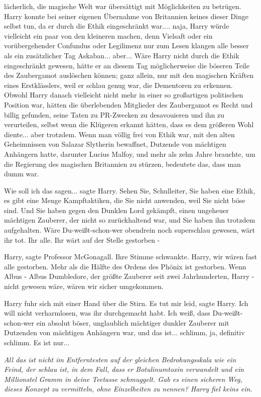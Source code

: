 lächerlich, die magische Welt war übersättigt mit Möglichkeiten zu betrügen.
Harry konnte bei seiner eigenen Übernahme von Britannien keines dieser Dinge
selbst tun, da er durch die Ethik eingeschränkt war.... naja, Harry würde
vielleicht ein paar von den kleineren machen, denn Vielsaft oder ein
vorübergehender Confundus oder Legilimenz nur zum Lesen klangen alle besser als
ein zusätzlicher Tag Askaban... aber... Wäre Harry nicht durch die Ethik
eingeschränkt gewesen, hätte er an diesem Tag möglicherweise die böseren Teile
des Zaubergamot auslöschen können; ganz allein, nur mit den magischen Kräften
eines Erstklässlers, weil er schlau genug war, die Dementoren zu erkennen.
Obwohl Harry danach vielleicht nicht mehr in einer so großartigen politischen
Position war, hätten die überlebenden Mitglieder des Zaubergamot es Recht und
billig gefunden, seine Taten zu PR-Zwecken zu desavouieren und ihn zu
verurteilen, selbst wenn die Klügeren erkannt hätten, dass es dem größeren Wohl
diente... aber trotzdem. Wenn man völlig frei von Ethik war, mit den alten
Geheimnissen von Salazar Slytherin bewaffnet, Dutzende von mächtigen Anhängern
hatte, darunter Lucius Malfoy, und mehr als zehn Jahre brauchte, um die
Regierung des magischen Britannien zu stürzen, bedeutete das, dass man dumm war.

\glqq Wie soll ich das sagen...\grqq{} sagte Harry. \glqq Sehen Sie,
Schulleiter, Sie haben eine Ethik, es gibt eine Menge Kampftaktiken, die Sie
nicht anwenden, weil Sie nicht böse sind. Und Sie haben gegen den Dunklen Lord
gekämpft, einen ungeheuer mächtigen Zauberer, der nicht so zurückhaltend war,
und Sie haben ihn trotzdem aufgehalten. Wäre Du-weißt-schon-wer obendrein noch
superschlau gewesen, wärt ihr tot. Ihr alle. Ihr wärt auf der Stelle gestorben
-\grqq{}

\glqq Harry\grqq{}, sagte Professor McGonagall. Ihre Stimme schwankte. \glqq
Harry, wir wären fast alle gestorben. Mehr als die Hälfte des Ordens des Phönix
ist gestorben. Wenn Albus - Albus Dumbledore, der größte Zauberer seit zwei
Jahrhunderten, Harry - nicht gewesen wäre, wären wir sicher umgekommen.\grqq{}

Harry fuhr sich mit einer Hand über die Stirn. \glqq Es tut mir leid\grqq{},
sagte Harry. \glqq Ich will nicht verharmlosen, was ihr durchgemacht habt. Ich
weiß, dass Du-weißt-schon-wer ein absolut böser, unglaublich mächtiger dunkler
Zauberer mit Dutzenden von mächtigen Anhängern war, und das ist... schlimm, ja,
definitiv schlimm. Es ist nur...\grqq{}

\emph{All das ist nicht im Entferntesten auf der gleichen Bedrohungsskala wie ein Feind, der schlau ist, in dem Fall, dass er Botulinumtoxin verwandelt und ein Millionstel Gramm in deine Teetasse schmuggelt. Gab es einen sicheren Weg, dieses Konzept zu vermitteln, ohne Einzelheiten zu nennen? Harry fiel keins ein.}

